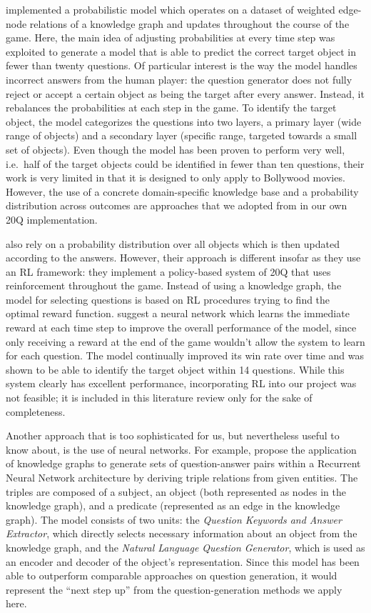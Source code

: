 \documentclass[11pt,a4paper]{article}
\begin{document}
\citet{DeyEa2019} implemented a probabilistic model which operates on a dataset of weighted edge-node relations of a knowledge graph and updates throughout the course of the game. 
Here, the main idea of adjusting probabilities at every time step was exploited to generate a model that is able to predict the correct target object in fewer than twenty questions. 
Of particular interest is the way the model handles incorrect answers from the human player: the question generator does not fully reject or accept a certain object as being the target after every answer. 
Instead, it rebalances the probabilities at each step in the game. 
To identify the target object, the model categorizes the questions into two layers, a primary layer (wide range of objects) and a secondary layer (specific range, targeted towards a small set of objects). 
Even though the model has been proven to perform very well, i.e.\ half of the target objects could be identified in fewer than ten questions, their work is very limited in that it is designed to only apply to Bollywood movies. 
However, the use of a concrete domain-specific knowledge base and a probability distribution across outcomes are approaches that we adopted from \citet{DeyEa2019} in our own 20Q implementation.

\citet{HuEa2018} also rely on a probability distribution over all objects which is then updated according to the answers.
However, their approach is different insofar as they use an RL framework: they implement a policy-based system of 20Q that uses reinforcement throughout the game. 
Instead of using a knowledge graph, the model for selecting questions is based on RL procedures trying to find the optimal reward function. 
\citet{HuEa2018} suggest a neural network which learns the immediate reward at each time step to improve the overall performance of the model, since only receiving a reward at the end of the game wouldn't allow the system to learn for each question.
The model continually improved its win rate over time and was shown to be able to identify the target object within 14 questions.
While this system clearly has excellent performance, incorporating RL into our project was not feasible; it is included in this literature review only for the sake of completeness.

Another approach that is too sophisticated for us, but nevertheless useful to know about, is the use of neural networks.
For example, \citet{ReddyEa2017} propose the application of knowledge graphs to generate sets of question-answer pairs within a Recurrent Neural Network architecture by deriving triple relations from given entities. 
The triples are composed of a subject, an object (both represented as nodes in the knowledge graph), and a predicate (represented as an edge in the knowledge graph). 
The model consists of two units: the \textit{Question Keywords and Answer Extractor}, which directly selects necessary information about an object from the knowledge graph, and the \textit{Natural Language Question Generator}, which is used as an encoder and decoder of the object's representation. 
Since this model has been able to outperform comparable approaches on question generation, it would represent the ``next step up'' from the question-generation methods we apply here.
\end{document}
